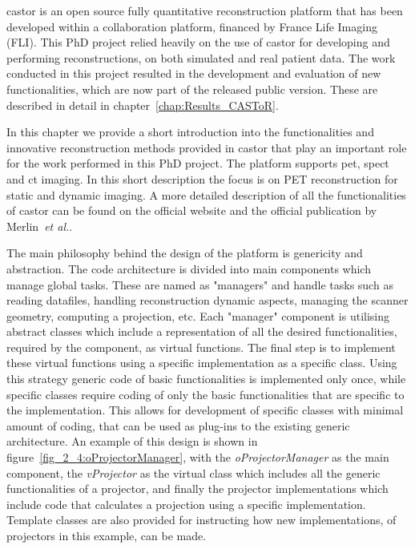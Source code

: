\Gls{castor} is an open source fully quantitative reconstruction platform that has been developed within a collaboration platform, financed by France Life Imaging (FLI). This PhD project relied heavily on the use of \gls{castor} for developing and performing reconstructions, on both simulated and real patient data. The work conducted in this project resulted in the development and evaluation of new functionalities, which are now part of the released public version. These are described in detail in chapter~\ref{chap:Results_CASToR}. 

In this chapter we provide a short introduction into the functionalities and innovative reconstruction methods provided in \gls{castor} that play an important role for the work performed in this PhD project. 
The platform supports \gls{pet}, \gls{spect} and \gls{ct} imaging. 
In this short description the focus is on PET reconstruction for static and dynamic imaging. A more detailed description of all the functionalities of \gls{castor} can be found on the official website and the official publication by Merlin~\textit{et al.}\cite{Merlin2018}. 

The main philosophy behind the design of the platform is genericity and abstraction. The code architecture is divided into main components which manage global tasks. These are named as "managers" and handle tasks such as reading datafiles, handling reconstruction dynamic aspects, managing the scanner geometry, computing a projection, etc. 
Each "manager" component is utilising abstract classes which include a representation of all the desired functionalities, required by the component, as virtual functions. The final step is to implement these virtual functions using a specific implementation as a specific class. 
Using this strategy generic code of basic functionalities is implemented only once, while specific classes require coding of only the basic functionalities that are specific to the implementation. This allows for development of specific classes with minimal amount of coding, that can be used as plug-ins to the existing generic architecture. 
An example of this design is shown in figure~\ref{fig_2_4:oProjectorManager}, with the \textit{oProjectorManager} as the main component, the \textit{vProjector} as the virtual class which includes all the generic functionalities of a projector, and finally the projector implementations which include code that calculates a projection using a specific implementation. Template classes are also provided for instructing how new implementations, of projectors in this example, can be made. 

